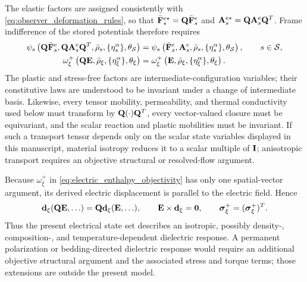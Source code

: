 The elastic factors are assigned consistently with
\eqref{eq:observer_deformation_rules}, so that
\(\bar{\mathbf{F}}_s^{e\star}=\mathbf{Q}\bar{\mathbf{F}}_s^e\) and
\(\mathbf{A}_s^{e\star}=\mathbf{Q}\mathbf{A}_s^e\mathbf{Q}^T\).  Frame indifference of the
stored potentials therefore requires
%
\begin{subequations}
	\label{eq:stored_potential_objectivity}
	\begin{align}
		\psi_s\left(
		\mathbf{Q}\bar{\mathbf{F}}_s^e,
		\mathbf{Q}\mathbf{A}_s^e\mathbf{Q}^T,
		\bar\rho_s,\{\eta_s^\alpha\},\theta_{\mathcal{S}}
		\right)
		 & =
		\psi_s\left(
		\bar{\mathbf{F}}_s^e,\mathbf{A}_s^e,
		\bar\rho_s,\{\eta_s^\alpha\},\theta_{\mathcal{S}}
		\right),
		\qquad
		s\in\mathcal{S},
		\label{eq:solid_energy_objectivity} \\
		\omega_\xi^+\left(
		\mathbf{Q}\mathbf{E},
		\bar\rho_\xi,\{\eta_\xi^\alpha\},\theta_\xi
		\right)
		 & =
		\omega_\xi^+\left(
		\mathbf{E},
		\bar\rho_\xi,\{\eta_\xi^\alpha\},\theta_\xi
		\right).
		\label{eq:electric_enthalpy_objectivity}
	\end{align}
\end{subequations}
%
The plastic and stress-free factors are intermediate-configuration variables;
their constitutive laws are understood to be invariant under a change of
intermediate basis.  Likewise, every tensor mobility, permeability, and thermal
conductivity used below must transform by
\(\mathbf{Q}(\cdot)\mathbf{Q}^T\), every vector-valued closure must be equivariant, and
the scalar reaction and plastic mobilities must be invariant.  If such a
transport tensor depends only on the scalar state variables displayed in this
manuscript, material isotropy reduces it to a scalar multiple of \(\mathbf{I}\);
anisotropic transport requires an objective structural or resolved-flow
argument.

Because \(\omega_\xi^+\) in
\eqref{eq:electric_enthalpy_objectivity} has only one spatial-vector argument,
its derived electric displacement is parallel to the electric field.  Hence
%
\begin{equation}
	\mathbf{d}_\xi(\mathbf{Q}\mathbf{E},\ldots)
	=
	\mathbf{Q}\mathbf{d}_\xi(\mathbf{E},\ldots),
	\qquad
	\mathbf{E}\times\mathbf{d}_\xi=\mathbf{0},
	\qquad
	\boldsymbol{\sigma}_\xi^+
	=
	(\boldsymbol{\sigma}_\xi^+)^T .
	\label{eq:objective_electrical_response_symmetry}
\end{equation}
%
Thus the present electrical state set describes an isotropic, possibly
density-, composition-, and temperature-dependent dielectric response.  A
permanent polarization or bedding-directed dielectric response would require an
additional objective structural argument and the associated stress and torque
terms; those extensions are outside the present model.

